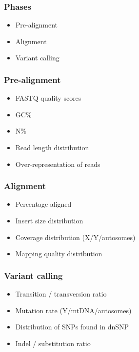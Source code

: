 \documentclass[slidestop,14pt]{beamer}
\begin{document}

\begin{frame}
  \frametitle{Phases}

  \vspace{\baselineskip}

  \begin{itemize}
    \item Pre-alignment
    \item Alignment
    \item Variant calling
  \end{itemize}
\end{frame}

\begin{frame}
  \frametitle{Pre-alignment}

  \vspace{\baselineskip}

  \begin{itemize}
    \item FASTQ quality scores
    \item GC\%
    \item N\%
    \item Read length distribution
    \item Over-representation of reads
  \end{itemize}
\end{frame}

\begin{frame}
  \frametitle{Alignment}

  \vspace{\baselineskip}

  \begin{itemize}
    \item Percentage aligned
    \item Insert size distribution
    \item Coverage distribution (X/Y/autosomes)
    \item Mapping quality distribution
  \end{itemize}
\end{frame}

\begin{frame}
  \frametitle{Variant calling}

  \vspace{\baselineskip}

  \begin{itemize}
    \item Transition / transversion ratio
    \item Mutation rate (Y/mtDNA/autosomes)
    \item Distribution of SNPs found in dnSNP
    \item Indel / substitution ratio
  \end{itemize}
\end{frame}
\end{document}
